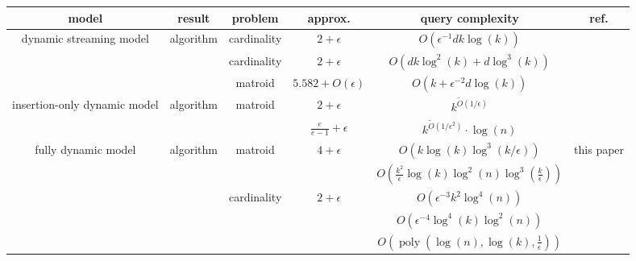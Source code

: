 \documentclass[11pt]{article}
\DeclareMathOperator{\poly}{poly}
\begin{document}
\begin{table*}[h]
\begin{center}
\begin{tabular}{|c|c|c|c|c|c|}
\hline
model & result & problem & approx. & query complexity  & ref. \\
\hline
 
\multirow{3}{*}{\parbox{2.5cm}{dynamic streaming model} } 
        &  \multirow{2}{*}{algorithm} & cardinality& $2+\epsilon$ & $O(\epsilon^{-1}dk\log(k))$  & \cite{DBLP:conf/icml/MirzasoleimanK017} \\
        
        &   & cardinality & $2+\epsilon$ & $O(dk\log^2(k)+d\log^3(k))$  & \cite{DBLP:conf/icml/0001ZK18} \\
        &   & matroid & $5.582+O(\epsilon)$ & $O(k+\epsilon^{-2}d\log(k))$  & \cite{DBLP:conf/icml/DuettingFLNZ22} \\
\hline

\multirow{2}{*}{\parbox{2.5cm}{insertion-only dynamic model }  }
        &  \multirow{2}{*}{algorithm} & \multirow{2}{*}{matroid}& $2+\epsilon$ & $k^{\tilde{O}(1/\epsilon)}$  & \cite{DBLP:journals/corr/abs-2111-03198} \\
        
        &   && $\frac{e}{e-1}+\epsilon$ & $k^{\tilde{O}(1/\epsilon^2)}\cdot \log(n)$  & \cite{DBLP:journals/corr/abs-2111-03198} \\
\hline

\multirow{8}{*}{\parbox{2.5cm}{fully dynamic model} }     

        &   \multirow{6}{*}{algorithm}  & \multirow{2}{*}{matroid} & \multirow{2}{*}{$4+\epsilon$}  &  $O(k\log(k)\log^3(k/\epsilon))$ &   this paper \\

        &  &&   &  $O(\frac{k^2}{\epsilon}\log(k)\log^2(n)\log^3(\frac{k}{\epsilon}))$ & \cite{dutting2023fully} \\
 
        \cline{3-6}
 
        &  & \multirow{4}{*}{cardinality}& \multirow{4}{*}{$2 + \epsilon$}  &  $O(\epsilon^{-3}k^2\log^4(n))$  & \cite{DBLP:conf/nips/Monemizadeh20}  \\

        &  &&   &  $O(\epsilon^{-4}\log^4(k)\log^2(n))$ & \cite{LattanziMNTZ20update} \\

        &  &&   &  $O(\poly(\log(n), \log(k), \frac{1}{\epsilon}))$ & \cite{pmlr-v202-banihashem23a} \\
 

\end{tabular}
\end{center}
\end{table*}
\end{document}
